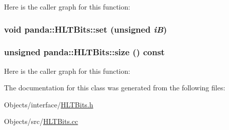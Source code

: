 Here is the caller graph for this function:\hypertarget{classpanda_1_1HLTBits_a72a95b5d1c4edc2bc5500b473506f80e}{
\subsubsection[{set}]{\setlength{\rightskip}{0pt plus 5cm}void panda::HLTBits::set (unsigned {\em iB})}}
\label{classpanda_1_1HLTBits_a72a95b5d1c4edc2bc5500b473506f80e}
\hypertarget{classpanda_1_1HLTBits_a3f467c754dbbe34c1d9a063b6b29a925}{
\subsubsection[{size}]{\setlength{\rightskip}{0pt plus 5cm}unsigned panda::HLTBits::size () const}}
\label{classpanda_1_1HLTBits_a3f467c754dbbe34c1d9a063b6b29a925}


Here is the caller graph for this function:

The documentation for this class was generated from the following files:\begin{DoxyCompactItemize}
\item 
Objects/interface/\hyperlink{HLTBits_8h}{HLTBits.h}\item 
Objects/src/\hyperlink{HLTBits_8cc}{HLTBits.cc}\end{DoxyCompactItemize}
